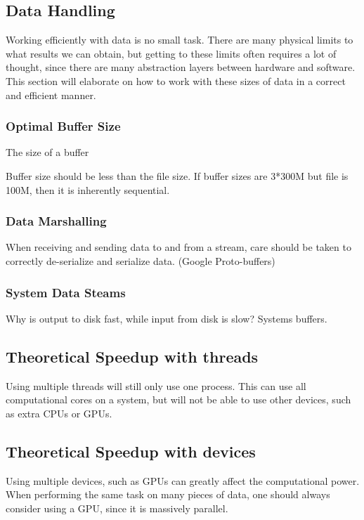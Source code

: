\documentclass[a4paper]{article}
\begin{document}
\newpage
\subsection{Data Handling}
Working efficiently with data is no small task. There are many physical limits to what results we can obtain, but getting
to these limits often requires a lot of thought, since there are many abstraction layers between hardware and software. This section
will elaborate on how to work with these sizes of data in a correct and efficient manner.


\subsubsection{Optimal Buffer Size}
The size of a buffer

Buffer size should be less than the file size. If buffer sizes are 3*300M but file is 100M,
then it is inherently sequential.



\subsubsection{Data Marshalling}
When receiving and sending data to and from a stream, care should be taken to correctly de-serialize and serialize data.
(Google Proto-buffers)


\subsubsection{System Data Steams}
Why is output to disk fast, while input from disk is slow? Systems buffers.



\subsection{Theoretical Speedup with threads}
Using multiple threads will still only use one process. This can use all computational cores on a system, but will not be able to use other devices, such as extra CPUs or GPUs.



\subsection{Theoretical Speedup with devices}
Using multiple devices, such as GPUs can greatly affect the computational power. When performing the same task on many pieces
of data, one should always consider using a GPU, since it is massively parallel.
\end{document}
